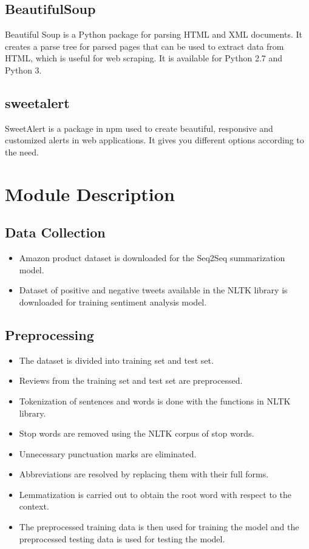 \documentclass[11pt]{report}
\begin{document}
\subsection{BeautifulSoup}
Beautiful Soup is a Python package for parsing HTML and XML documents. It creates a parse tree for parsed pages that can be used to extract data from HTML, which is useful for web scraping. It is available for Python 2.7 and Python 3.

\subsection{sweetalert}
SweetAlert is a package in npm used to create beautiful, responsive and customized alerts in web applications. It gives you different options according to the need.

\pagebreak
\section{Module Description}

\subsection{Data Collection}
\begin{itemize}
    \item Amazon product dataset is downloaded for the Seq2Seq summarization model.
    \item Dataset of positive and negative tweets available in the NLTK library is downloaded for training sentiment analysis model.
\end{itemize}

\subsection{Preprocessing}
\begin{itemize}
    \item The dataset is divided into training set and test set.
    \item Reviews from the training set and test set are preprocessed.
    \item Tokenization of sentences and words is done with the functions in NLTK library.
    \item Stop words are removed using the NLTK corpus of stop words.
    \item Unnecessary punctuation marks are eliminated.
    \item Abbreviations are resolved by replacing them with their full forms.
    \item Lemmatization is carried out to obtain the root word with respect to the context.
    \item The preprocessed training data is then used for training the model and the preprocessed testing data is used for testing the model.
\end{itemize}
\end{document}
